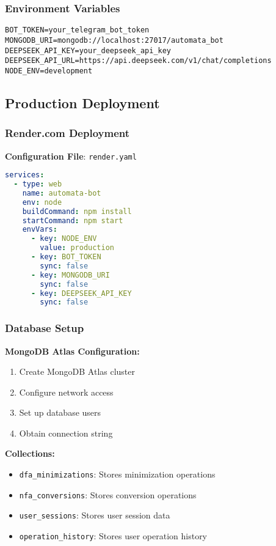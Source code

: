\documentclass[12pt]{article}
\begin{document}
\subsubsection{Environment Variables}
\begin{lstlisting}
BOT_TOKEN=your_telegram_bot_token
MONGODB_URI=mongodb://localhost:27017/automata_bot
DEEPSEEK_API_KEY=your_deepseek_api_key
DEEPSEEK_API_URL=https://api.deepseek.com/v1/chat/completions
NODE_ENV=development
\end{lstlisting}

\subsection{Production Deployment}

\subsubsection{Render.com Deployment}
\textbf{Configuration File}: \texttt{render.yaml}
\begin{lstlisting}[language=yaml]
services:
  - type: web
    name: automata-bot
    env: node
    buildCommand: npm install
    startCommand: npm start
    envVars:
      - key: NODE_ENV
        value: production
      - key: BOT_TOKEN
        sync: false
      - key: MONGODB_URI
        sync: false
      - key: DEEPSEEK_API_KEY
        sync: false
\end{lstlisting}

\subsubsection{Database Setup}
\textbf{MongoDB Atlas Configuration:}
\begin{enumerate}
    \item Create MongoDB Atlas cluster
    \item Configure network access
    \item Set up database users
    \item Obtain connection string
\end{enumerate}
\textbf{Collections:}
\begin{itemize}
    \item \texttt{dfa\_minimizations}: Stores minimization operations
    \item \texttt{nfa\_conversions}: Stores conversion operations
    \item \texttt{user\_sessions}: Stores user session data
    \item \texttt{operation\_history}: Stores user operation history
\end{itemize}
\end{document}
